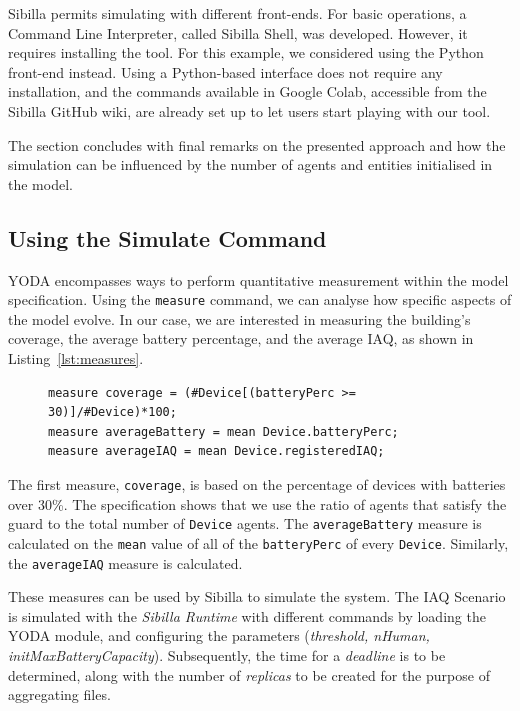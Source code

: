 \documentclass[runningheads]{llncs}
\newcommand{\yoda}{\textsf{YODA}}
\newcommand{\sibilla}{\textsf{Sibilla}}
\begin{document}
\sibilla{} permits simulating with different front-ends. For basic operations, a Command Line Interpreter, called \sibilla{} Shell, was developed. However, it requires installing the tool. For this example, we considered using the Python front-end instead. Using a Python-based interface does not require any installation, and the commands available in Google Colab, accessible from the \sibilla{} GitHub wiki, are already set up to let users start playing with our tool.

The section concludes with final remarks on the presented approach and how the simulation can be influenced by the number of agents and entities initialised in the model.
\subsection{Using the Simulate Command}\label{subsec:usingsim}

\yoda{} encompasses ways to perform quantitative measurement within the model specification.
%
Using the \lstinline{measure} command, we can analyse how specific aspects of the model evolve.
%
In our case, we are interested in measuring the building's coverage, the average battery percentage, and the average IAQ, as shown in Listing~\ref{lst:measures}.

\begin{figure}[htbp!]
\begin{lstlisting}[language=yoda,basicstyle=\scriptsize, caption={IAQ Scenario: Measures}, label={lst:measures}]
measure coverage = (#Device[(batteryPerc >= 30)]/#Device)*100;
measure averageBattery = mean Device.batteryPerc;
measure averageIAQ = mean Device.registeredIAQ;
\end{lstlisting}
\end{figure}

The first measure, \lstinline{coverage}, is based on the percentage of devices with batteries over 30\%. The specification shows that we use the ratio of agents that satisfy the guard to the total number of \lstinline{Device} agents.
%
The \lstinline{averageBattery} measure is calculated on the \lstinline{mean} value of all of the \lstinline{batteryPerc} of every \lstinline{Device}.
%
Similarly, the \lstinline{averageIAQ} measure is calculated.

These measures can be used by \sibilla{} to simulate the system.
%
The IAQ Scenario is simulated with the \emph{Sibilla Runtime} with different commands by loading the \yoda{} module, and configuring the parameters (\emph{threshold, nHuman, initMaxBatteryCapacity}). Subsequently, the time for a \emph{deadline} is to be determined, along with the number of \emph{replicas} to be created for the purpose of aggregating files.
\end{document}
